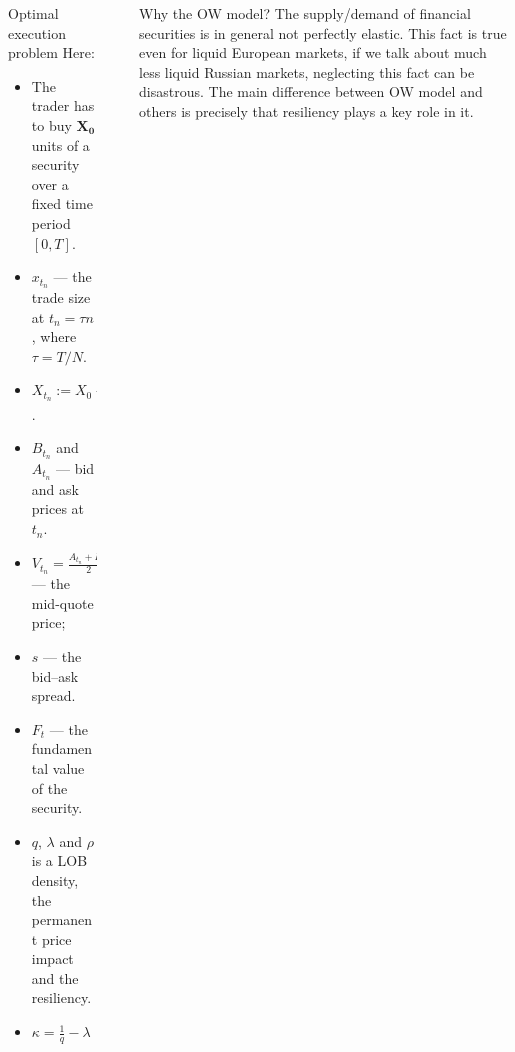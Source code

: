 \documentclass[]{beamer}
\begin{document}
\begin{frame}[t]
\begin{columns}[t]
\begin{column}{\onecolwid}
\begin{block}{Optimal execution problem}
       Here:
       \begin{itemize}
        \item The trader has to buy $\mathbf{X_0}$ units of a security over a ﬁxed time period $[0,T]$. 
        \item $x_{t_n}$ 
        --- the trade size at $t_n = \tau n$, where $\tau = T / N$. 
        \item $X_{t_n} := X_0 - \sum _{t_k < t_n} x_{t_k}$. 
        \item $B_{t_n}$ and $A_{t_n}$ --- bid and ask prices at $t_n$. 
        \item $V_{t_n} = \frac{A_{t_n} + B_{t_n}}{2}$ 
        --- the mid-quote price; 
        \item $s$ --- the bid–ask spread.
        \item $F_t$ --- the fundamental value of the security.
        \item $q$, $\lambda$ and $\rho$ is a LOB density, the permanent price impact and the resiliency.
         \item $\kappa = \frac{1}{q} - \lambda $

       \end{itemize}
        \end{block}
    
    
    \end{column} 
    \begin{column}{\sepwid}\end{column} %
    
    \begin{column}{\onecolwid} %

    \begin{block}{Why the OW model?}
        The supply/demand of ﬁnancial securities is in general not perfectly elastic. This fact is true even for liquid European markets, if we talk about 
        much less liquid Russian markets, neglecting this fact can be disastrous. The main difference between OW model and others is precisely 
        that resiliency plays a key role in it.
    \end{block}
    


\end{column}
\end{columns}
\end{frame}
\end{document}
